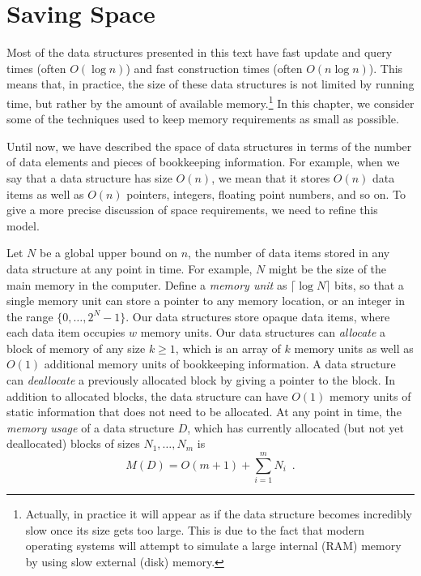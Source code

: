 \chapter{Saving Space}

Most of the data structures presented in this text have fast update
and query times (often $O(\log n)$) and fast construction times (often
$O(n\log n)$). This means that, in practice, the size of these data
structures is not limited by running time, but rather by the amount of
available memory.\footnote{Actually, in practice it will appear as if
the data structure becomes incredibly slow once its size gets too large.
This is due to the fact that modern operating systems will attempt to
simulate a large internal (RAM) memory by using slow external (disk)
memory.}  In this chapter, we consider some of the techniques used to
keep memory requirements as small as possible.

Until now, we have described the space of data structures in terms of the
number of data elements and pieces of bookkeeping information.  For
example, when we say that a data structure has size $O(n)$, we mean that it
stores $O(n)$ data items as well as $O(n)$ pointers, integers, floating
point numbers, and so on.  To give a more precise discussion of space
requirements, we need to refine this model.

Let $N$ be a global upper bound on $n$, the number of data items stored in
any data structure at any point in time.  For example, $N$ might be the
size of the main memory in the computer.  Define a \emph{memory unit} as
$\lceil\log N\rceil$ bits, so that a single memory unit can store a pointer
to any memory location, or an integer in the range $\{0,\ldots,2^{N}-1\}$.
Our data structures store opaque data items, where each data item occupies
$w$ memory units.  Our data structures can \emph{allocate} a block of
memory of any size $k\ge 1$, which is an array of $k$ memory units as well
as $O(1)$ additional memory units of bookkeeping information.  A data
structure can \emph{deallocate} a previously allocated block by giving a
pointer to the block.  In addition to allocated blocks, the data structure
can have $O(1)$ memory units of static information that does not need to be
allocated.  At any point in time, the \emph{memory usage} of a data
structure $D$, which has currently allocated (but not yet deallocated) blocks
of sizes $N_1,\ldots,N_m$ is 
\begin{equation}
  M(D) = O(m+1) + \sum_{i=1}^m N_i \enspace .  
\end{equation}

